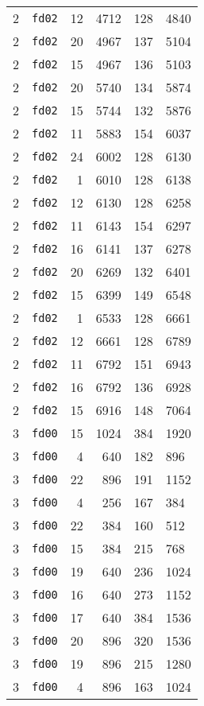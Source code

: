 \documentclass{article}
\begin{document}
\begin{table}[h!]
\begin{tabular}{llrrrl}
    2 & \texttt{fd02} & 12 & 4712 & 128 & 4840 \\
    2 & \texttt{fd02} & 20 & 4967 & 137 & 5104 \\
    2 & \texttt{fd02} & 15 & 4967 & 136 & 5103 \\
    2 & \texttt{fd02} & 20 & 5740 & 134 & 5874 \\
    2 & \texttt{fd02} & 15 & 5744 & 132 & 5876 \\
    2 & \texttt{fd02} & 11 & 5883 & 154 & 6037 \\
    2 & \texttt{fd02} & 24 & 6002 & 128 & 6130 \\
    2 & \texttt{fd02} & 1 & 6010 & 128 & 6138 \\
    2 & \texttt{fd02} & 12 & 6130 & 128 & 6258 \\
    2 & \texttt{fd02} & 11 & 6143 & 154 & 6297 \\
    2 & \texttt{fd02} & 16 & 6141 & 137 & 6278 \\
    2 & \texttt{fd02} & 20 & 6269 & 132 & 6401 \\
    2 & \texttt{fd02} & 15 & 6399 & 149 & 6548 \\
    2 & \texttt{fd02} & 1 & 6533 & 128 & 6661 \\
    2 & \texttt{fd02} & 12 & 6661 & 128 & 6789 \\
    2 & \texttt{fd02} & 11 & 6792 & 151 & 6943 \\
    2 & \texttt{fd02} & 16 & 6792 & 136 & 6928 \\
    2 & \texttt{fd02} & 15 & 6916 & 148 & 7064 \\
    3 & \texttt{fd00} & 15 & 1024 & 384 & 1920 \\
    3 & \texttt{fd00} & 4 & 640 & 182 & 896 \\
    3 & \texttt{fd00} & 22 & 896 & 191 & 1152 \\
    3 & \texttt{fd00} & 4 & 256 & 167 & 384 \\
    3 & \texttt{fd00} & 22 & 384 & 160 & 512 \\
    3 & \texttt{fd00} & 15 & 384 & 215 & 768 \\
    3 & \texttt{fd00} & 19 & 640 & 236 & 1024 \\
    3 & \texttt{fd00} & 16 & 640 & 273 & 1152 \\
    3 & \texttt{fd00} & 17 & 640 & 384 & 1536 \\
    3 & \texttt{fd00} & 20 & 896 & 320 & 1536 \\
    3 & \texttt{fd00} & 19 & 896 & 215 & 1280 \\
    3 & \texttt{fd00} & 4 & 896 & 163 & 1024 \\

\end{tabular}
\end{table}
\end{document}
